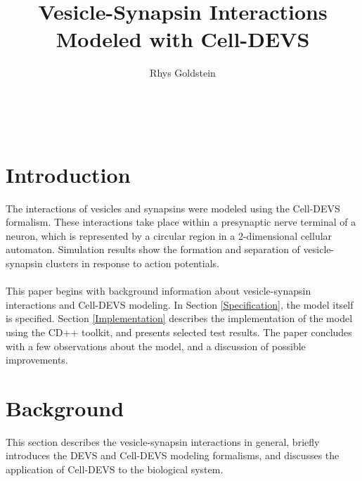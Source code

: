 \documentclass{acm_proc_article-sp}
\begin{document}
\title{Vesicle-Synapsin Interactions Modeled with Cell-DEVS}


\author{ \alignauthor Rhys Goldstein \\ 
    \\
    \\
    \\
     }

\maketitle


\section{Introduction}
The interactions of vesicles and synapsins were 
modeled using the Cell-DEVS formalism.  These
interactions take place within a presynaptic 
nerve terminal of a neuron, which is represented
by a circular region in a 2-dimensional cellular
automaton.  Simulation results show the formation
and separation of vesicle-synapsin clusters in 
response to action potentials. \\
\\
This paper begins with background information 
about vesicle-synapsin interactions and 
Cell-DEVS modeling.  
In Section \ref{Specification}, the model itself is 
specified.  Section \ref{Implementation}
describes the implementation of the model using 
the CD++ toolkit,
and presents selected test results.  The paper
concludes with a few observations about the model,
and a discussion of possible improvements.

\section{Background} \label{Background}
This section describes the vesicle-synapsin
interactions in general, briefly 
introduces the DEVS and Cell-DEVS modeling
formalisms, and discusses the application of Cell-DEVS
to the biological system. 
\end{document}
